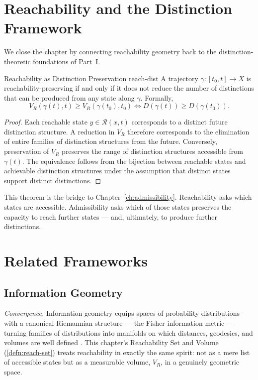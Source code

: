\documentclass[12pt,twoside,openright]{book}
\newcommand{\reach}{\mathcal{R}}
\begin{document}
\section{Reachability and the Distinction Framework}
\label{sec:ch13-connection}

We close the chapter by connecting reachability geometry
back to the distinction-theoretic foundations of Part~I.

\begin{theorem}{Reachability as Distinction Preservation}%
  {reach-dist}
  A trajectory $\gamma:[t_0,t]\to X$ is
  reachability-preserving if and only if it does not reduce
  the number of distinctions that can be produced from any
  state along $\gamma$. Formally,
  \[
    V_R(\gamma(t),t) \ge V_R(\gamma(t_0),t_0)
    \iff
    D(\gamma(t)) \ge D(\gamma(t_0)).
  \]
\end{theorem}

\begin{proof}
  Each reachable state $y\in\reach(x,t)$ corresponds to a
  distinct future distinction structure. A reduction in
  $V_R$ therefore corresponds to the elimination of entire
  families of distinction structures from the future.
  Conversely, preservation of $V_R$ preserves the range of
  distinction structures accessible from $\gamma(t)$. The
  equivalence follows from the bijection between reachable
  states and achievable distinction structures under the
  assumption that distinct states support distinct
  distinctions.
\end{proof}

This theorem is the bridge to Chapter~\ref{ch:admissibility}.
Reachability asks which states are accessible.
Admissibility asks which of those states preserves the
capacity to reach further states --- and, ultimately, to
produce further distinctions.

\section{Related Frameworks}
\label{sec:ch13-related-frameworks}

\subsection*{Information Geometry}

\emph{Convergence.} Information geometry equips spaces of
probability distributions with a canonical Riemannian
structure --- the Fisher information metric --- turning
families of distributions into manifolds on which distances,
geodesics, and volumes are well defined
\parencite{amari2016,ay2017}. This chapter's Reachability Set
and Volume (\cref{defn:reach-set}) treats reachability in
exactly the same spirit: not as a mere list of accessible
states but as a measurable volume, $V_R$, in a genuinely
geometric space.
\end{document}
